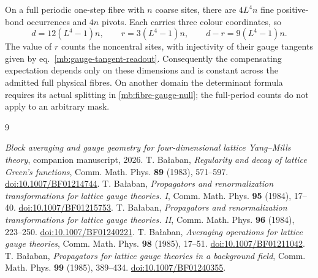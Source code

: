 \documentclass[11pt,letterpaper,reqno]{amsart}
\numberwithin{equation}{section}
\renewcommand{\eqref}[1]{\textup{eq.~\ref{#1}}}
\theoremstyle{definition}
\theoremstyle{remark}
\begin{document}
On a full periodic one-step fibre with $n$ coarse sites,
there are $4L^4n$ fine positive-bond occurrences and $4n$
pivots. Each carries three colour coordinates, so
\[
 d=12(L^4-1)n,\qquad r=3(L^4-1)n,\qquad d-r=9(L^4-1)n.
\]
The value of $r$ counts the noncentral sites, with injectivity
of their gauge tangents given by \eqref{mb:gauge-tangent-readout}.
Consequently the compensating expectation depends only on
these dimensions and is constant across the admitted full
physical fibres. On another domain the determinant formula
requires its actual splitting in \cref{mb:fibre-gauge-null};
the full-period counts do not apply to an arbitrary mask.

\clearpage
\begin{thebibliography}{9}
\raggedright
{} \emph{Block averaging and gauge geometry for four-dimensional lattice Yang--Mills theory}, companion manuscript, 2026.
 T. Ba\l aban, \emph{Regularity and decay of lattice Green's functions}, Comm. Math. Phys. \textbf{89} (1983), 571--597. \href{https://doi.org/10.1007/BF01214744}{doi:10.1007/BF01214744}.
 T. Ba\l aban, \emph{Propagators and renormalization transformations for lattice gauge theories. I}, Comm. Math. Phys. \textbf{95} (1984), 17--40. \href{https://doi.org/10.1007/BF01215753}{doi:10.1007/BF01215753}.
 T. Ba\l aban, \emph{Propagators and renormalization transformations for lattice gauge theories. II}, Comm. Math. Phys. \textbf{96} (1984), 223--250. \href{https://doi.org/10.1007/BF01240221}{doi:10.1007/BF01240221}.
 T. Ba\l aban, \emph{Averaging operations for lattice gauge theories}, Comm. Math. Phys. \textbf{98} (1985), 17--51. \href{https://doi.org/10.1007/BF01211042}{doi:10.1007/BF01211042}.
 T. Ba\l aban, \emph{Propagators for lattice gauge theories in a background field}, Comm. Math. Phys. \textbf{99} (1985), 389--434. \href{https://doi.org/10.1007/BF01240355}{doi:10.1007/BF01240355}.
\end{thebibliography}
\end{document}
